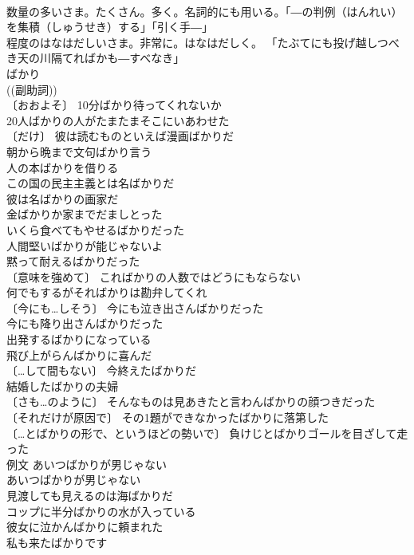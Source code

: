 \documentclass[8pt]{extreport}
\begin{document}
\begin{CJK}{UTF8}{min}
\\	数量の多いさま。たくさん。多く。名詞的にも用いる。「―の判例（はんれい）を集積（しゅうせき）する」「引く手―」 
\\	程度のはなはだしいさま。非常に。はなはだしく。 「たぶてにも投げ越しつべき天の川隔てればかも―すべなき」
\\	ばかり		
\\	((副助詞)) 
\\	〔おおよそ〕 10分ばかり待ってくれないか 
\\	20人ばかりの人がたまたまそこにいあわせた 
\\	〔だけ〕 彼は読むものといえば漫画ばかりだ 
\\	朝から晩まで文句ばかり言う 
\\	人の本ばかりを借りる 
\\	この国の民主主義とは名ばかりだ 
\\	彼は名ばかりの画家だ 
\\	金ばかりか家までだましとった 
\\	いくら食べてもやせるばかりだった 
\\	人間堅いばかりが能じゃないよ 
\\	黙って耐えるばかりだった 
\\	〔意味を強めて〕 こればかりの人数ではどうにもならない 
\\	何でもするがそればかりは勘弁してくれ 
\\	〔今にも…しそう〕 今にも泣き出さんばかりだった 
\\	今にも降り出さんばかりだった 
\\	出発するばかりになっている 
\\	飛び上がらんばかりに喜んだ 
\\	〔…して間もない〕 今終えたばかりだ 
\\	結婚したばかりの夫婦 
\\	〔さも…のように〕 そんなものは見あきたと言わんばかりの顔つきだった 
\\	〔それだけが原因で〕 その1題ができなかったばかりに落第した 
\\	〔…とばかりの形で、というほどの勢いで〕 負けじとばかりゴールを目ざして走った 
\\	例文 あいつばかりが男じゃない 
\\	あいつばかりが男じゃない 
\\	見渡しても見えるのは海ばかりだ 
\\	コップに半分ばかりの水が入っている 
\\	彼女に泣かんばかりに頼まれた 
\\	私も来たばかりです 

\end{CJK}
\end{document}
